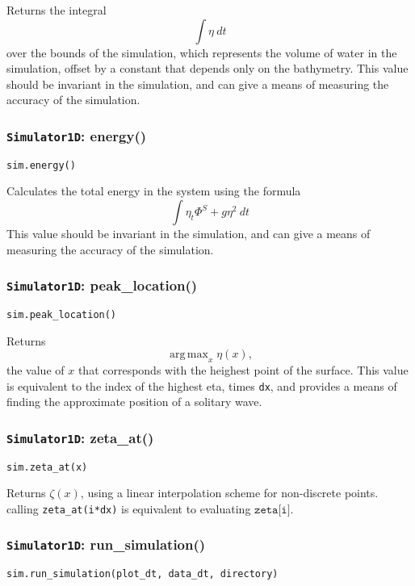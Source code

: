 \documentclass[10pt,a4paper]{article}
\DeclareMathOperator*{\argmax}{arg\,max}
\begin{document}
Returns the integral
$$\int \eta~dt$$
over the bounds of the simulation, which represents the volume of water in the simulation, offset by a constant that depends only on the bathymetry. This value should be invariant in the simulation, and can give a means of measuring the accuracy of the simulation.




\subsubsection{\texttt{Simulator1D}: energy()}
\texttt{sim.energy()}

Calculates the total energy in the system using the formula
$$\int \eta_t\Phi^S + g\eta^2~dt$$
This value should be invariant in the simulation, and can give a means of measuring the accuracy of the simulation.



\subsubsection{\texttt{Simulator1D}: peak\_location()}
\texttt{sim.peak\_location()}

Returns $$\argmax_{x} \eta(x),$$ the value of $x$ that corresponds with the heighest point of the surface. This value is equivalent to the index of the highest eta, times \texttt{dx}, and provides a means of finding the approximate position of a solitary wave.



\subsubsection{\texttt{Simulator1D}: zeta\_at()}
\texttt{sim.zeta\_at(x)}

Returns $\zeta(x)$, using a linear interpolation scheme for non-discrete points. calling \texttt{zeta\_at(i*dx)} is equivalent to evaluating $\texttt{zeta[i]}$.




\subsubsection{\texttt{Simulator1D}: run\_simulation()}
\texttt{sim.run\_simulation(plot\_dt, data\_dt, directory)}
\end{document}
